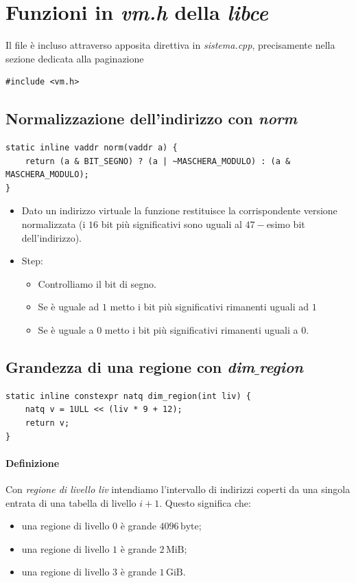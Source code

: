 \documentclass[11pt]{report}
\theoremstyle{definition}
\begin{document}
\section{Funzioni in \emph{vm.h} della \emph{libce}}
Il file è incluso attraverso apposita direttiva in \emph{sistema.cpp}, precisamente nella sezione dedicata alla paginazione
\begin{verbatim}
#include <vm.h>
\end{verbatim}
\subsection{Normalizzazione dell'indirizzo con \emph{norm}}
\small 
\begin{verbatim}
static inline vaddr norm(vaddr a) {
    return (a & BIT_SEGNO) ? (a | ~MASCHERA_MODULO) : (a & MASCHERA_MODULO);
}
\end{verbatim}
\normalsize 
\begin{itemize}
	\item Dato un indirizzo virtuale la funzione restituisce la corrispondente versione normalizzata (i $16$ bit più significativi sono uguali al $47-$esimo bit dell'indirizzo).
	\item Step:
	\begin{itemize}
		\item Controlliamo il bit di segno.
		\item Se è uguale ad $1$ metto i bit più significativi rimanenti uguali ad $1$
		\item Se è uguale a 0 metto  i bit più significativi rimanenti uguali a $0$.
	\end{itemize}
\end{itemize}
\subsection{Grandezza di una regione con \emph{dim$\_$region}}
\small 
\begin{verbatim}
static inline constexpr natq dim_region(int liv) {
    natq v = 1ULL << (liv * 9 + 12);
    return v;
}
\end{verbatim}
\normalsize 
\paragraph{Definizione} Con \emph{regione di livello liv} intendiamo l'intervallo di indirizzi coperti da una singola entrata di una tabella di livello $i+1$. Questo significa che:
\begin{itemize}
	\item una regione di livello $0$ è grande $4096\,\text{byte}$;
	\item una regione di livello $1$ è grande $2\,\text{MiB}$;
	\item una regione di livello $3$ è grande $1\,\text{GiB}$.
\end{itemize}
\end{document}
